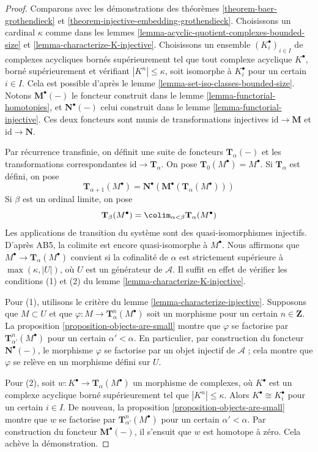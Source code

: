 \begin{proof}
Comparons avec les démonstrations des
théorèmes \ref{theorem-baer-grothendieck} et
\ref{theorem-injective-embedding-grothendieck}.
Choisissons un cardinal $\kappa$ comme dans les
lemmes \ref{lemma-acyclic-quotient-complexes-bounded-size} et
\ref{lemma-characterize-K-injective}.
Choisissons un ensemble $(K_i^\bullet)_{i \in I}$ de complexes acycliques
bornés supérieurement tel que tout complexe acyclique $K^\bullet$, borné
supérieurement et vérifiant $|K^n| \leq \kappa$, soit isomorphe à
$K_i^\bullet$ pour un certain $i \in I$. Cela est possible d'après le
lemme \ref{lemma-set-iso-classes-bounded-size}.
Notons $\mathbf{M}^\bullet(-)$ le foncteur construit dans le
lemme \ref{lemma-functorial-homotopies}, et
$\mathbf{N}^\bullet(-)$ celui construit dans le
lemme \ref{lemma-functorial-injective}.
Ces deux foncteurs sont munis de transformations injectives
$\text{id} \to \mathbf{M}$ et $\text{id} \to \mathbf{N}$.

\medskip\noindent
Par récurrence transfinie, on définit une suite de foncteurs
$\mathbf{T}_\alpha(-)$ et les transformations correspondantes
$\text{id} \to \mathbf{T}_\alpha$. On pose
$\mathbf{T}_0(M^\bullet) = M^\bullet$. Si $\mathbf{T}_\alpha$ est défini,
on pose
$$
\mathbf{T}_{\alpha + 1}(M^\bullet) =
\mathbf{N}^\bullet(\mathbf{M}^\bullet(\mathbf{T}_\alpha(M^\bullet)))
$$
Si $\beta$ est un ordinal limite, on pose
$$
\mathbf{T}_\beta(M^\bullet) =
\colim_{\alpha < \beta} \mathbf{T}_\alpha(M^\bullet)
$$
Les applications de transition du système sont des quasi-isomorphismes
injectifs. D'après AB5, la colimite est encore quasi-isomorphe à $M^\bullet$.
Nous affirmons que $M^\bullet \to \mathbf{T}_\alpha(M^\bullet)$ convient si
la cofinalité de $\alpha$ est strictement supérieure à
$\max(\kappa, |U|)$, où $U$ est un générateur de $\mathcal{A}$.
Il suffit en effet de vérifier les conditions (1) et (2) du
lemme \ref{lemma-characterize-K-injective}.

\medskip\noindent
Pour (1), utilisons le critère du
lemme \ref{lemma-characterize-injective}.
Supposons que $M \subset U$ et que
$\varphi : M \to \mathbf{T}^n_\alpha(M^\bullet)$ soit un morphisme pour un
certain $n \in \mathbf{Z}$. La
proposition \ref{proposition-objects-are-small} montre que $\varphi$ se
factorise par $\mathbf{T}^n_{\alpha'}(M^\bullet)$ pour un certain
$\alpha' < \alpha$. En particulier, par construction du foncteur
$\mathbf{N}^\bullet(-)$, le morphisme $\varphi$ se factorise par un objet
injectif de $\mathcal{A}$ ; cela montre que $\varphi$ se relève en un morphisme
défini sur $U$.

\medskip\noindent
Pour (2), soit $w : K^\bullet \to \mathbf{T}_\alpha(M^\bullet)$ un morphisme
de complexes, où $K^\bullet$ est un complexe acyclique borné supérieurement
tel que $|K^n| \leq \kappa$. Alors $K^\bullet \cong K_i^\bullet$ pour un
certain $i \in I$. De nouveau, la
proposition \ref{proposition-objects-are-small} montre que $w$ se factorise
par $\mathbf{T}^n_{\alpha'}(M^\bullet)$ pour un certain $\alpha' < \alpha$.
Par construction du foncteur $\mathbf{M}^\bullet(-)$, il s'ensuit que $w$
est homotope à zéro. Cela achève la démonstration.
\end{proof}
